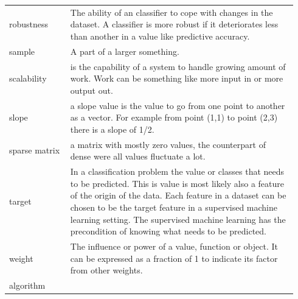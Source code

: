 \documentclass[a4paper,10pt]{article}
\begin{document}
\begin{tabular}{ p{0.20\linewidth} p{0.7437\linewidth} }
	
	robustness &  The ability of an classifier to cope with changes in the dataset. A classifier is more robust if it deteriorates less than another in a value like predictive accuracy. \\ [1ex]	
	
	sample & A part of a larger something.\\ [1ex]
	
	scalability & is the capability of a system to handle growing amount of work. Work can be something like more input in or more output out. \\[1ex]	
	
	slope & a slope value is the value to go from one point to another as a vector. For example from point (1,1) to point (2,3) there is a slope of 1/2.\\[1ex]
	
	sparse matrix & a matrix with mostly zero values, the counterpart of dense were all values fluctuate a lot.	\\ [1ex]
	
	target & In a classification problem the value or classes that needs to be predicted. This is value is most likely also a feature of the origin of the data. Each feature in a dataset can be chosen to be the target feature in a supervised machine learning setting. The supervised machine learning has the precondition of knowing what needs to be predicted. \\ [+1ex]	
	
	weight & The influence or power of a value, function or object. It can be expressed as a fraction of 1 to indicate its factor from other weights.	\\ [1ex]
	
	
	
	
	
	
	algorithm & \\ [1ex]	
	\end{tabular}
\end{document}
